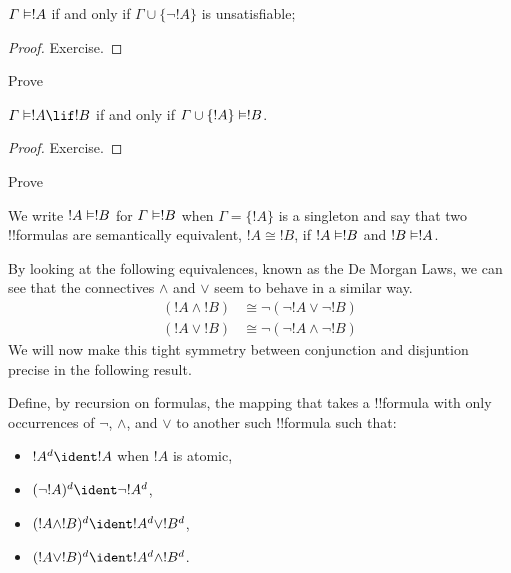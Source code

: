 \documentclass[../../../include/open-logic-section]{subfiles}
\begin{document}
\begin{prop}
  $\Gamma \Entails !A$ if and only if $\Gamma \cup \{\lnot !A\}$
  is unsatisfiable; 
\end{prop}

\begin{proof}
Exercise.
\end{proof}

\begin{prob}
Prove 
\end{prob}

\begin{thm}
   $\Gamma \Entails !A \lif !B$ if and only
  if $\Gamma \cup \{!A\} \Entails !B$.
\end{thm}

\begin{proof}
Exercise.
\end{proof}

\begin{prob}
Prove 
\end{prob}

We write $!A \Entails !B$ for $\Gamma \Entails !B$ when $\Gamma = \{!A\}$ is a singleton and say that two !!{formula}s are semantically equivalent, $!A \cong !B$, if $!A \Entails !B$ and $!B \Entails !A$.

By looking at the following equivalences, known as the De Morgan Laws, we can see that the connectives $\land$ and $\lor$ seem to behave in a similar way. 
  \begin{align*}
    ({!A} \land {!B}) &\cong \lnot(\lnot{!A} \lor \lnot{!B})\\
    ({!A} \lor {!B}) &\cong \lnot(\lnot{!A} \land \lnot{!B})
  \end{align*}
We will now make this tight symmetry between conjunction and disjuntion precise in the following result.

\begin{defn}
Define, by recursion on formulas, the mapping that takes a !!{formula} with only occurrences of $\lnot$, $\land$, and $\lor$ to another such !!{formula} such that:
\begin{itemize}
  \item $!A^d \ident !A$ when $!A$ is atomic,
  \item $(\lnot !A )^d \ident \lnot !A^d$,
  \item $(!A \land !B)^d \ident !A^d \lor !B^d$,
  \item $(!A \lor !B)^d \ident !A^d \land !B^d$.
\end{itemize}
\end{defn}
\end{document}
